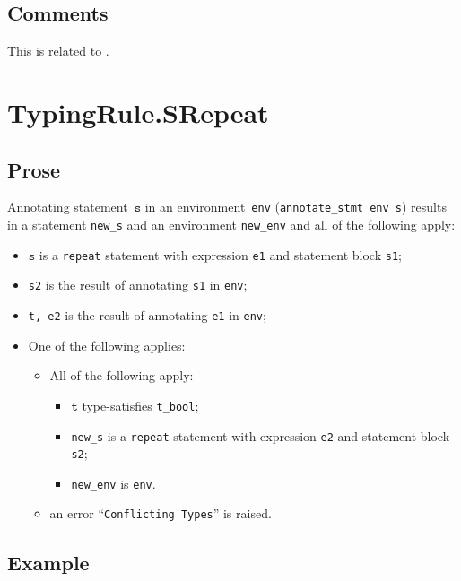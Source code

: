 \documentclass{book}
\newcommand\vt[0]{\texttt{t}}
\newcommand\vs[0]{\texttt{s}}
\begin{document}
\begin{itemize}
\subsection{Comments}
    This is related to .

\section{TypingRule.SRepeat \label{sec:TypingRule.SRepeat}}

  \subsection{Prose}
Annotating statement~$\vs$ in an environment~\texttt{env}
(\texttt{annotate\_stmt env s}) results in a statement \texttt{new\_s} and an
environment \texttt{new\_env} and all of the following apply:
   \begin{itemize}
   \item $\vs$ is a \texttt{repeat} statement with expression \texttt{e1} and statement block \texttt{s1};
   \item \texttt{s2} is the result of annotating \texttt{s1} in \texttt{env};
   \item \texttt{t, e2} is the result of annotating \texttt{e1} in \texttt{env};
   \item One of the following applies:
     \begin{itemize}
     \item All of the following apply:
       \begin{itemize}
       \item $\vt$ type-satisfies \texttt{t\_bool};
       \item \texttt{new\_s} is a \texttt{repeat} statement with expression \texttt{e2} and statement block \texttt{s2};
       \item \texttt{new\_env} is \texttt{env}.
       \end{itemize}
     \item an error ``\texttt{Conflicting Types}'' is raised.
     \end{itemize}
   \end{itemize}

  \subsection{Example}




\end{itemize}
\end{document}
